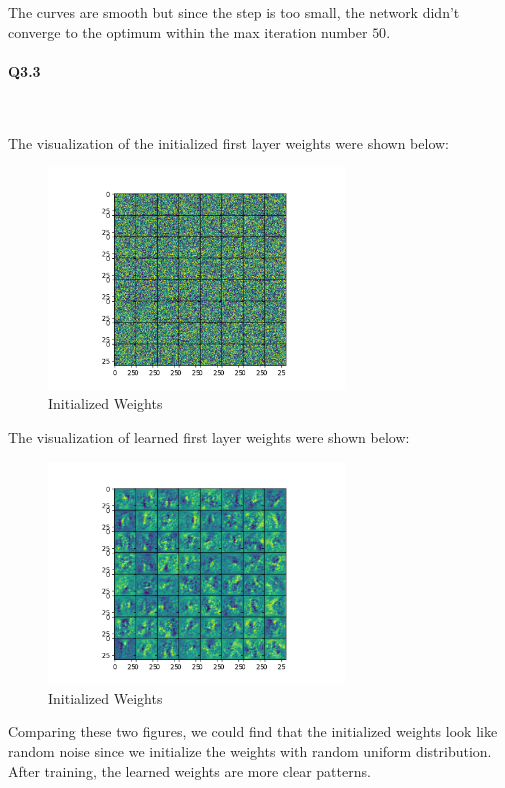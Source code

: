 \documentclass[11pt]{article} \usepackage{fullpage} \usepackage{graphicx} \usepackage{epstopdf} \usepackage{color} \usepackage{psfrag} \usepackage{pdfsync}\usepackage{indentfirst}\usepackage{subfigure}\usepackage{float}\usepackage[section]{placeins}
\begin{document}
The curves are smooth but since the step is too small, the network didn't converge to the optimum within the max iteration number $50$.

\paragraph{Q3.3}~{}

The visualization of the initialized first layer weights were shown below:
\begin{figure}[H]
\centering
\includegraphics[width=0.7\textwidth]{results/q3_3_before.png}
\caption{Initialized Weights}
\end{figure}

The visualization of learned first layer weights were shown below:
\begin{figure}[H]
\centering
\includegraphics[width=0.7\textwidth]{results/q3_3_after.png}
\caption{Initialized Weights}
\end{figure}

Comparing these two figures, we could find that the initialized weights look like random noise since we initialize the weights with random uniform distribution. After training, the learned weights are more clear patterns.
\end{document}
